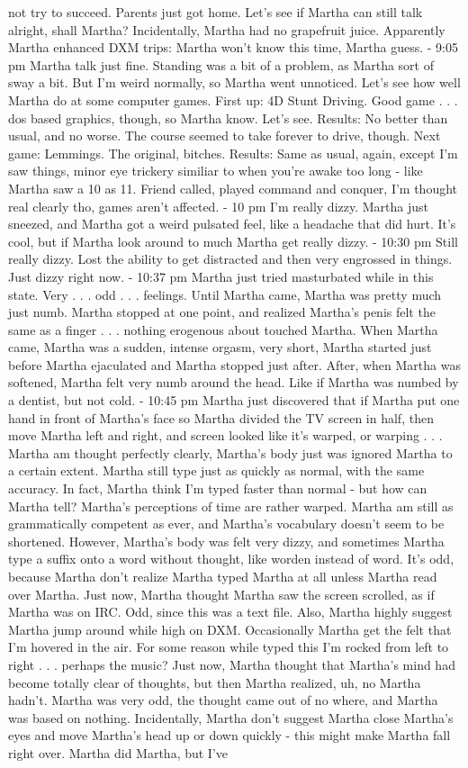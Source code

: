 \documentclass[12pt]{book}
\begin{document}
not try to succeed. Parents just got home. Let's see if Martha can still talk alright, shall Martha? Incidentally, Martha had no grapefruit juice. Apparently Martha enhanced DXM trips: Martha won't know this time, Martha guess. - 9:05 pm Martha talk just fine. Standing was a bit of a problem, as Martha sort of sway a bit. But I'm weird normally, so Martha went unnoticed. Let's see how well Martha do at some computer games. First up: 4D Stunt Driving. Good game . . .  dos based graphics, though, so Martha know. Let's see. Results: No better than usual, and no worse. The course seemed to take forever to drive, though. Next game: Lemmings. The original, bitches. Results: Same as usual, again, except I'm saw things, minor eye trickery similiar to when you're awake too long - like Martha saw a 10 as 11. Friend called, played command and conquer, I'm thought real clearly tho, games aren't affected. - 10 pm I'm really dizzy. Martha just sneezed, and Martha got a weird pulsated feel, like a headache that did hurt. It's cool, but if Martha look around to much Martha get really dizzy. - 10:30 pm Still really dizzy. Lost the ability to get distracted and then very engrossed in things. Just dizzy right now. - 10:37 pm Martha just tried masturbated while in this state. Very . . .  odd . . .  feelings. Until Martha came, Martha was pretty much just numb. Martha stopped at one point, and realized Martha's penis felt the same as a finger . . .  nothing erogenous about touched Martha. When Martha came, Martha was a sudden, intense orgasm, very short, Martha started just before Martha ejaculated and Martha stopped just after. After, when Martha was softened, Martha felt very numb around the head. Like if Martha was numbed by a dentist, but not cold. - 10:45 pm Martha just discovered that if Martha put one hand in front of Martha's face so Martha divided the TV screen in half, then move Martha left and right, and screen looked like it's warped, or warping . . .  Martha am thought perfectly clearly, Martha's body just was ignored Martha to a certain extent. Martha still type just as quickly as normal, with the same accuracy. In fact, Martha think I'm typed faster than normal - but how can Martha tell? Martha's perceptions of time are rather warped. Martha am still as grammatically competent as ever, and Martha's vocabulary doesn't seem to be shortened. However, Martha's body was felt very dizzy, and sometimes Martha type a suffix onto a word without thought, like worden instead of word. It's odd, because Martha don't realize Martha typed Martha at all unless Martha read over Martha. Just now, Martha thought Martha saw the screen scrolled, as if Martha was on IRC. Odd, since this was a text file. Also, Martha highly suggest Martha jump around while high on DXM. Occasionally Martha get the felt that I'm hovered in the air. For some reason while typed this I'm rocked from left to right . . .  perhaps the music? Just now, Martha thought that Martha's mind had become totally clear of thoughts, but then Martha realized, uh, no Martha hadn't. Martha was very odd, the thought came out of no where, and Martha was based on nothing. Incidentally, Martha don't suggest Martha close Martha's eyes and move Martha's head up or down quickly - this might make Martha fall right over. Martha did Martha, but I've 
\end{document}
